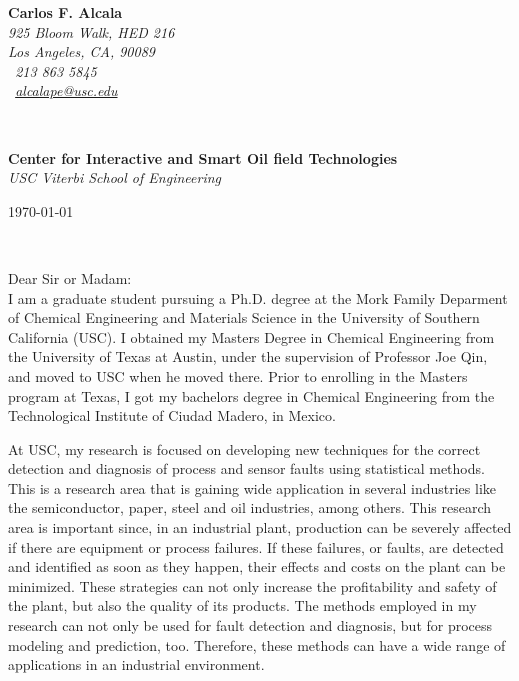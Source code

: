\documentclass[11pt]{article}
\begin{document}
\sffamily   %
\hfill%
\begin{minipage}[t]{.6\textwidth}
\raggedleft%
{\bfseries Carlos F. Alcala}\\[.35ex]
\small\itshape%
925 Bloom Walk, HED 216\\
Los Angeles, CA, 90089\\[.35ex]
\Mobilefone~213 863 5845\\
\Letter~\href{mailto:alcalape@usc.edu}{alcalape@usc.edu}
\end{minipage}\\[1em]
%
\begin{minipage}[t]{.6\textwidth}
\raggedright%
{\bfseries Center for Interactive and Smart Oil field Technologies}\\[.35ex]
\small\itshape%
USC Viterbi School of Engineering\\

\end{minipage}
\hfill %
\begin{minipage}[t]{.35\textwidth}
\raggedleft %
\today
\end{minipage}\\[2em]
\raggedright
Dear Sir or Madam:\\[1.5em]
%

I am a graduate student pursuing a Ph.D. degree at the Mork Family Deparment of Chemical Engineering and Materials Science in the University of Southern California (USC). I obtained my Masters Degree in Chemical Engineering from the University of Texas at Austin, under the supervision of Professor Joe Qin, and moved to USC when he moved there. Prior to enrolling in the Masters program at Texas, I got my bachelors degree in Chemical Engineering from the Technological Institute of Ciudad Madero, in Mexico.

At USC, my research is focused on developing new techniques for the correct detection and diagnosis of process and sensor faults using statistical methods. This is a research area that is gaining wide application in several industries like the semiconductor, paper, steel and oil industries, among others. This research area is important since, in an industrial plant, production can be severely affected if there are equipment or process failures. If these failures, or faults, are detected and identified as soon as they happen, their effects and costs on the plant can be minimized. These strategies can not only increase the profitability and safety of the plant, but also the quality of its products. The methods employed in my research can not only be used for fault detection and diagnosis, but for process modeling and prediction, too. Therefore, these methods can have a wide range of applications in an industrial environment. 
\end{document}
